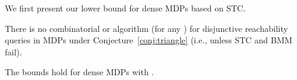 \documentclass[11pt,letterpaper]{article}
\newcommand{\lu}{\textup{(}}
\newcommand{\ru}{\textup{)}\xspace}
\newcommand{\upbr}[1]{\lu #1\ru}
\newif\iffullversion
\newcommand{\infull}[1]{\iffullversion #1\fi}
\begin{document}
\infull{
Here we complement the above algorithm by conditional lower bounds for disjunctive reachability queries in MDPs.
These lower bound will be based on the conjectures STC, SETH, and OVC 
introduced in Section~\ref{sec:conjectures}.
}

We first present our lower bound for dense MDPs based on STC.
\begin{theorem}\label{thm:reach_STChard}
  There is no combinatorial  or  algorithm \upbr{for any } for disjunctive reachability queries in MDPs under Conjecture~\ref{conj:triangle} \upbr{i.e., unless STC and BMM fail}. 
  \infull{In particular, there is no such algorithm deciding whether the winning set is non-empty
  or deciding whether a specific vertex is in the winning set.}
  The bounds hold for dense MDPs with .
\end{theorem}
\end{document}
